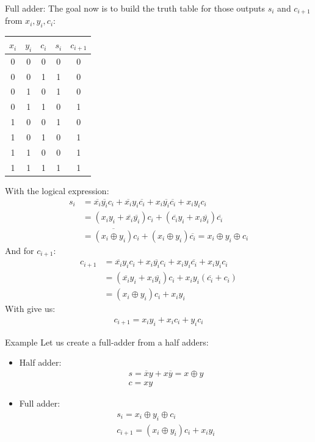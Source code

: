 \begin{parag}{Full adder:}
    The goal now is to build the truth table for those outputs $s_i$ and $c_{i+1}$ from $x_i, y_i, c_i$:
    \begin{center}
    \begin{tabular}{ccccc}
        $x_i$ & $y_i$ & $c_i$ & $s_i$ & $c_{i+1}$ \\
        \hline
        0 & 0 & 0&0&0 \\
        0&0&1&1&0\\
        0&1&0&1&0\\
        0&1&1&0&1\\
        1&0&0&1&0\\
        1&0&1&0&1\\
        1&1&0&0&1\\
        1&1&1&1&1
    \end{tabular}
    \end{center}
    
    With the logical expression:
    \begin{align*}
        s_i &= \overline{x_i} \overline{y_i}c_i + \overline{x_i}y_i \overline{c_i} + x_i \overline{y_i} \overline{c_i} + x_iy_ic_i \\
            &= (x_iy_i + \overline{x_i} \overline{y_i})c_i + ( \overline{c_i}y_i + x_i \overline{y_i}) \overline{c_i} \\
            &= \overline{(x_i \oplus y_i)} c_i + (x_i \oplus y_i) \overline{c_i} = x_i \oplus y_i \oplus c_i
    \end{align*}
    And for $c_{i+1}$:
    \begin{align*}
        c_{i+1} &= \overline{x_i}y_ic_i + x_i \overline{y_i}c_i + x_iy_i \overline{c_i} + x_iy_ic_i \\
                &= ( \overline{x_i}y_i + x_i \overline{y_i})c_i + x_iy_i( \overline{c_i} + c_i) \\
                &= (x_i \oplus y_i)c_i + x_iy_i
    \end{align*}
    With give us:
    \begin{align*}
        c_{i+1} = x_iy_i + x_ic_i + y_ic_i
    \end{align*}
    \begin{subparag}{Example}
        Let us create a full-adder from a half adders:\\
        \begin{itemize}
            \item Half adder:
                \begin{align*}
                    s = \overline{x}y + x \overline{y} = x \oplus y\\
                    c = xy
                \end{align*}
            \item Full adder:
                \begin{align*}
                    s_i = x_i \oplus y_i \oplus c_i\\
                    c_{i+1} = (x_i \oplus y_i)c_i + x_iy_i
                \end{align*}
        \end{itemize}


\end{subparag}
\end{parag}
